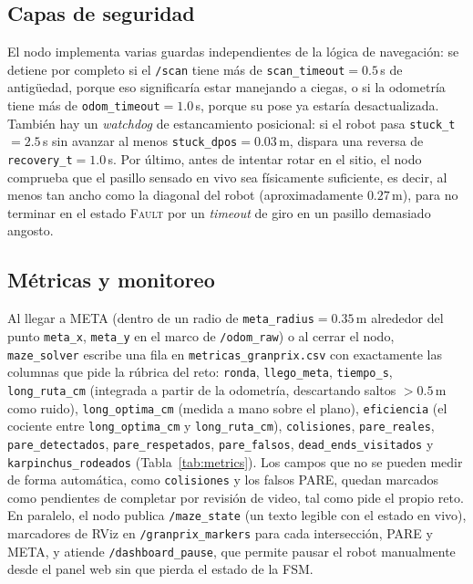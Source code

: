 \documentclass[conference]{IEEEtran}
\begin{document}
\subsection{Capas de seguridad}
El nodo implementa varias guardas independientes de la lógica de navegación: se detiene por completo si el \texttt{/scan} tiene más de \texttt{scan\_timeout}$=0.5$\,s de antigüedad, porque eso significaría estar manejando a ciegas, o si la odometría tiene más de \texttt{odom\_timeout}$=1.0$\,s, porque su pose ya estaría desactualizada. También hay un \emph{watchdog} de estancamiento posicional: si el robot pasa \texttt{stuck\_t}$=2.5$\,s sin avanzar al menos \texttt{stuck\_dpos}$=0.03$\,m, dispara una reversa de \texttt{recovery\_t}$=1.0$\,s. Por último, antes de intentar rotar en el sitio, el nodo comprueba que el pasillo sensado en vivo sea físicamente suficiente, es decir, al menos tan ancho como la diagonal del robot (aproximadamente $0.27$\,m), para no terminar en el estado \textsc{Fault} por un \emph{timeout} de giro en un pasillo demasiado angosto.

\subsection{Métricas y monitoreo}
Al llegar a META (dentro de un radio de \texttt{meta\_radius}$=0.35$\,m alrededor del punto \texttt{meta\_x}, \texttt{meta\_y} en el marco de \texttt{/odom\_raw}) o al cerrar el nodo, \texttt{maze\_solver} escribe una fila en \texttt{metricas\_granprix.csv} con exactamente las columnas que pide la rúbrica del reto: \texttt{ronda}, \texttt{llego\_meta}, \texttt{tiempo\_s}, \texttt{long\_ruta\_cm} (integrada a partir de la odometría, descartando saltos $>0.5$\,m como ruido), \texttt{long\_optima\_cm} (medida a mano sobre el plano), \texttt{eficiencia} (el cociente entre \texttt{long\_optima\_cm} y \texttt{long\_ruta\_cm}), \texttt{colisiones}, \texttt{pare\_reales}, \texttt{pare\_detectados}, \texttt{pare\_respetados}, \texttt{pare\_falsos}, \texttt{dead\_ends\_visitados} y \texttt{karpinchus\_rodeados} (Tabla~\ref{tab:metrics}). Los campos que no se pueden medir de forma automática, como \texttt{colisiones} y los falsos PARE, quedan marcados como pendientes de completar por revisión de video, tal como pide el propio reto. En paralelo, el nodo publica \texttt{/maze\_state} (un texto legible con el estado en vivo), marcadores de RViz en \texttt{/granprix\_markers} para cada intersección, PARE y META, y atiende \texttt{/dashboard\_pause}, que permite pausar el robot manualmente desde el panel web sin que pierda el estado de la FSM.
\end{document}
